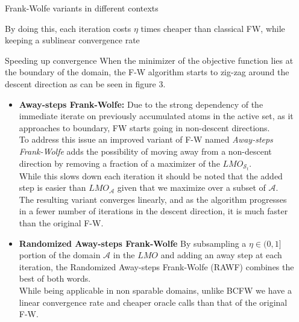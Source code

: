 \documentclass[final]{beamer}
\newlength{\sepwidth}
\newlength{\colwidth}
\newcommand{\separatorcolumn}{\begin{column}{\sepwidth}\end{column}}
\begin{document}
\begin{frame}[t]
\begin{columns}[t]
\begin{column}{\colwidth}
\begin{block}{Frank-Wolfe variants in different contexts}
\begin{itemize}
      By doing this, each iteration costs $\eta$ times cheaper than classical FW, while keeping a sublinear convergence rate
    \end{itemize}
  \end{block}
    \begin{block}{Speeding up convergence}
    When the minimizer of the objective function lies at the boundary of the domain, the F-W algorithm starts to zig-zag around the descent direction as can be seen in figure 3.
    \begin{itemize}
    \item  \textbf{Away-steps Frank-Wolfe: }Due to the strong dependency of the immediate iterate on previously accumulated atoms in the active set, as it approaches to boundary, FW starts going in non-descent directions.\\
    To address this issue an improved variant of F-W named \textit{Away-steps Frank-Wolfe} adds the possibility of moving away from a non-descent direction by removing a fraction of a maximizer of the $LMO_{\mathcal{S}_{t}}$.\\
    While this slows down each iteration it should be noted that the added step is easier than $LMO_{\mathcal{A}}$ given that we maximize over a subset of $\mathcal{A}$.\\ The resulting variant converges linearly, and as the algorithm progresses in a fewer number of iterations in the descent direction, it is much faster than the original F-W.
    \item \textbf{Randomized Away-steps Frank-Wolfe}
    By subsampling a $\eta\in(0,1]$ portion of the domain $\mathcal{A}$ in the $LMO$ and adding an away step at each iteration, the Randomized Away-steps Frank-Wolfe (RAWF) combines the best of both words.\\
    While being applicable in non sparable domains, unlike BCFW we have a linear convergence rate and cheaper oracle calls than that of the original F-W.
    \end{itemize}
  \end{block}

\end{column}

\separatorcolumn
\end{columns}
\end{frame}
\end{document}
